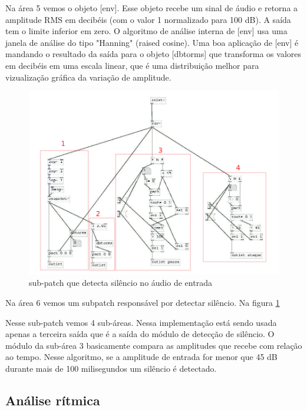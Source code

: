 \documentclass{ppgmus}
\begin{document}
Na área 5 vemos o objeto [env\texttildelow]. Esse objeto recebe um sinal de áudio
e retorna a amplitude RMS em decibéis (com o valor 1 normalizado para 100 dB).
A saída tem o limite inferior em zero. O algoritmo de análise interna de [env\texttildelow]
usa uma janela de análise do tipo "Hanning" (raised cosine). Uma boa aplicação de 
[env\texttildelow] é mandando o resultado da saída para o objeto [dbtorms] que transforma
os valores em decibéis em uma escala linear, que é uma distribuição melhor para vizualização
gráfica da variação de amplitude.






\begin{figure}[!htt]
\includegraphics[scale=.5]{sinc-audioanalise-detecta}
\caption{sub-patch que detecta silêncio no áudio de entrada}
\label{[sinc-audioanalise-detecta]}
\end{figure}




Na área 6 vemos um subpatch responsável por detectar
silêncio. Na figura \ref{[sinc-audioanalise-detecta]}


Nesse sub-patch vemos 4 sub-áreas. Nessa implementação
está sendo usada apenas a terceira saída que é a saída do
módulo de detecção de silêncio. O módulo da sub-área 3
basicamente compara as amplitudes que recebe com relação ao tempo.
Nesse algoritmo, se a amplitude de entrada for menor que 45 dB durante
mais de 100 milisegundos um silêncio é detectado.



\subsection{Análise rítmica}
\end{document}
